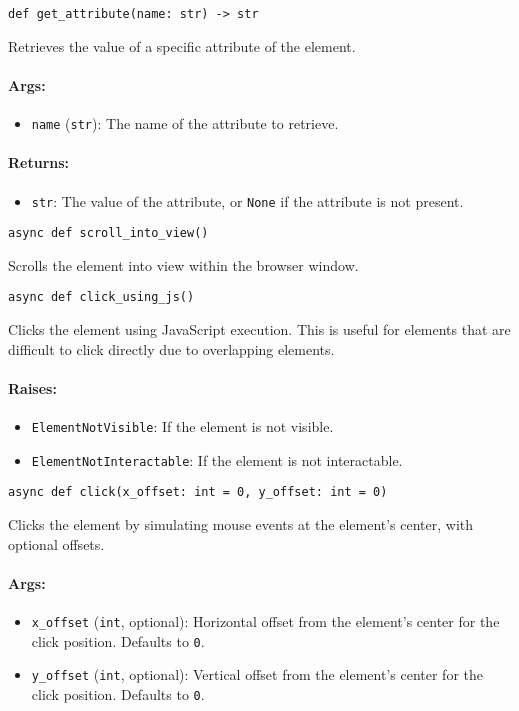 \documentclass{article}
\begin{document}
\noindent\texttt{def get\_attribute(name: str) -> str}

\noindent Retrieves the value of a specific attribute of the element.

\paragraph{Args:}
\begin{itemize}
    \item \texttt{name} (\texttt{str}): The name of the attribute to retrieve.
\end{itemize}

\paragraph{Returns:}
\begin{itemize}
    \item \texttt{str}: The value of the attribute, or \texttt{None} if the attribute is not present.
\end{itemize}

\noindent\texttt{async def scroll\_into\_view()}

\noindent Scrolls the element into view within the browser window.

\noindent\texttt{async def click\_using\_js()}

\noindent Clicks the element using JavaScript execution. This is useful for elements that are difficult to click directly due to overlapping elements.

\paragraph{Raises:}
\begin{itemize}
    \item \texttt{ElementNotVisible}: If the element is not visible.
    \item \texttt{ElementNotInteractable}: If the element is not interactable.
\end{itemize}

\noindent\texttt{async def click(x\_offset: int = 0, y\_offset: int = 0)}

\noindent Clicks the element by simulating mouse events at the element's center, with optional offsets.

\paragraph{Args:}
\begin{itemize}
    \item \texttt{x\_offset} (\texttt{int}, optional): Horizontal offset from the element's center for the click position. Defaults to \texttt{0}.
    \item \texttt{y\_offset} (\texttt{int}, optional): Vertical offset from the element's center for the click position. Defaults to \texttt{0}.
\end{itemize}
\end{document}
